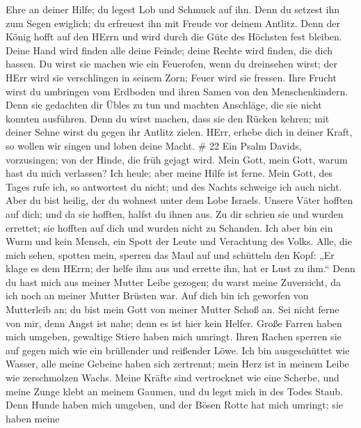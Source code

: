 Ehre an deiner Hilfe; du legest Lob und Schmuck auf ihn. 
Denn du setzest ihn zum Segen ewiglich; du erfreuest ihn mit Freude vor
deinem Antlitz.  Denn der König hofft auf den HErrn und wird
durch die Güte des Höchsten fest bleiben.  Deine Hand wird
finden alle deine Feinde; deine Rechte wird finden, die dich hassen.
 Du wirst sie machen wie ein Feuerofen, wenn du dreinsehen
wirst; der HErr wird sie verschlingen in seinem Zorn; Feuer wird sie
fressen.  Ihre Frucht wirst du umbringen vom Erdboden und
ihren Samen von den Menschenkindern.  Denn sie gedachten
dir Übles zu tun und machten Anschläge, die sie nicht konnten ausführen.
 Denn du wirst machen, dass sie den Rücken kehren; mit
deiner Sehne wirst du gegen ihr Antlitz zielen.  HErr,
erhebe dich in deiner Kraft, so wollen wir singen und loben deine Macht.
\# 22  Ein Psalm Davids, vorzusingen; von der Hinde, die
früh gejagt wird.  Mein Gott, mein Gott, warum hast du mich
verlassen? Ich heule; aber meine Hilfe ist ferne.  Mein
Gott, des Tages rufe ich, so antwortest du nicht; und des Nachts
schweige ich auch nicht.  Aber du bist heilig, der du
wohnest unter dem Lobe Israels.  Unsere Väter hofften auf
dich; und da sie hofften, halfst du ihnen aus.  Zu dir
schrien sie und wurden errettet; sie hofften auf dich und wurden nicht
zu Schanden.  Ich aber bin ein Wurm und kein Mensch, ein
Spott der Leute und Verachtung des Volks.  Alle, die mich
sehen, spotten mein, sperren das Maul auf und schütteln den Kopf:
 „Er klage es dem HErrn; der helfe ihm aus und errette ihn,
hat er Lust zu ihm.``  Denn du hast mich aus meiner Mutter
Leibe gezogen; du warst meine Zuversicht, da ich noch an meiner Mutter
Brüsten war.  Auf dich bin ich geworfen von Mutterleib an;
du bist mein Gott von meiner Mutter Schoß an.  Sei nicht
ferne von mir, denn Angst ist nahe; denn es ist hier kein Helfer.
 Große Farren haben mich umgeben, gewaltige Stiere haben
mich umringt.  Ihren Rachen sperren sie auf gegen mich wie
ein brüllender und reißender Löwe.  Ich bin ausgeschüttet
wie Wasser, alle meine Gebeine haben sich zertrennt; mein Herz ist in
meinem Leibe wie zerschmolzen Wachs.  Meine Kräfte sind
vertrocknet wie eine Scherbe, und meine Zunge klebt an meinem Gaumen,
und du legst mich in des Todes Staub.  Denn Hunde haben
mich umgeben, und der Bösen Rotte hat mich umringt; sie haben meine
